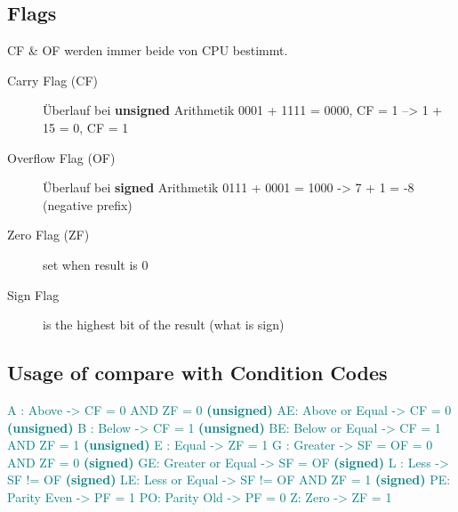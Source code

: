 \begin{multicols*}{4}
\section{Flags}
CF \& OF werden immer beide von CPU bestimmt.

\begin{description}
    \item[Carry Flag (CF)] Überlauf bei \textbf{unsigned} Arithmetik
    0001 + 1111 = 0000, CF = 1 --> 1 + 15 = 0, CF = 1
    \item[Overflow Flag (OF)] Überlauf bei \textbf{signed} Arithmetik
    0111 + 0001 = 1000 -> 7 + 1 = -8 (negative prefix)
    \item[Zero Flag (ZF)] set when result is 0
    \item[Sign Flag] is the highest bit of the result (what is sign)
\end{description}

\subsection{Usage of compare with Condition Codes}
\textcolor{teal}{A : Above } \textcolor{teal}{ -> CF = 0 AND ZF = 0 \textbf{(unsigned)}}\newline
\textcolor{teal}{AE: Above or Equal } \textcolor{teal}{ -> CF = 0 \textbf{(unsigned)}}\newline
\textcolor{teal}{B : Below } \textcolor{teal}{ -> CF = 1 \textbf{(unsigned)}}\newline
\textcolor{teal}{BE: Below or Equal } \textcolor{teal}{ -> CF = 1 AND ZF = 1 \textbf{(unsigned)}}\newline
\textcolor{teal}{E : Equal } \textcolor{teal}{ -> ZF = 1}\newline
\textcolor{teal}{G : Greater } \textcolor{teal}{ -> SF = OF = 0 AND ZF = 0 \textbf{(signed)}}\newline
\textcolor{teal}{GE: Greater or Equal } \textcolor{teal}{ -> SF = OF \textbf{(signed)}}\newline
\textcolor{teal}{L : Less } \textcolor{teal}{ -> SF != OF \textbf{(signed)}}\newline
\textcolor{teal}{LE: Less or Equal } \textcolor{teal}{ -> SF != OF AND ZF = 1 \textbf{(signed)}}\newline
\textcolor{teal}{PE: Parity Even}  \textcolor{teal}{ -> PF = 1}\newline
\textcolor{teal}{PO: Parity Old } \textcolor{teal}{ -> PF = 0}\newline
\textcolor{teal}{Z:  Zero} \textcolor{teal}{ -> ZF = 1}


\end{multicols*}

